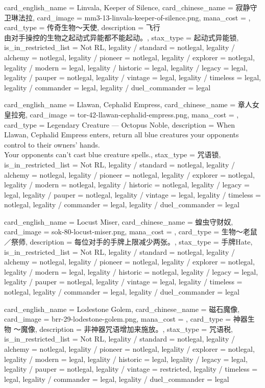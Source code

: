 \documentclass[lang = cn, color = black, 10pt]{AllThatStax}
\begin{document}
\card
{
	card_english_name = {Linvala, Keeper of Silence},
	card_chinese_name = {寂静守卫琳法拉},
	card_image = mm3-13-linvala-keeper-of-silence.png,
	mana_cost = ,
	card_type = 传奇生物～天使,
	description = {飞行\\
		由对手操控的生物之起动式异能都不能起动。},
	stax_type = 起动式异能锁,
	is_in_restricted_list = Not RL,
	legality / standard = notlegal,
	legality / alchemy = notlegal,
	legality / pioneer = notlegal,
	legality / explorer = notlegal,
	legality / modern = legal,
	legality / historic = legal,
	legality / legacy = legal,
	legality / pauper = notlegal,
	legality / vintage = legal,
	legality / timeless = legal,
	legality / commander = legal,
	legality / duel_commander = legal
}

\card
{
	card_english_name = {Llawan, Cephalid Empress},
	card_chinese_name = {章人女皇拉宛},
	card_image = tor-42-llawan-cephalid-empress.png,
	mana_cost = ,
	card_type = Legendary Creature — Octopus Noble,
	description = {When Llawan, Cephalid Empress enters, return all blue creatures your opponents control to their owners' hands.\\
		Your opponents can't cast blue creature spells.},
	stax_type = 咒语锁,
	is_in_restricted_list = Not RL,
	legality / standard = notlegal,
	legality / alchemy = notlegal,
	legality / pioneer = notlegal,
	legality / explorer = notlegal,
	legality / modern = notlegal,
	legality / historic = notlegal,
	legality / legacy = legal,
	legality / pauper = notlegal,
	legality / vintage = legal,
	legality / timeless = notlegal,
	legality / commander = legal,
	legality / duel_commander = legal
}

\card
{
	card_english_name = {Locust Miser},
	card_chinese_name = {蝗虫守财奴},
	card_image = sok-80-locust-miser.png,
	mana_cost = ,
	card_type = 生物～老鼠／祭师,
	description = {每位对手的手牌上限减少两张。},
	stax_type = 手牌Hate,
	is_in_restricted_list = Not RL,
	legality / standard = notlegal,
	legality / alchemy = notlegal,
	legality / pioneer = notlegal,
	legality / explorer = notlegal,
	legality / modern = legal,
	legality / historic = notlegal,
	legality / legacy = legal,
	legality / pauper = notlegal,
	legality / vintage = legal,
	legality / timeless = notlegal,
	legality / commander = legal,
	legality / duel_commander = legal
}

\card
{
	card_english_name = {Lodestone Golem},
	card_chinese_name = {磁石魔像},
	card_image = brr-29-lodestone-golem.png,
	mana_cost = ,
	card_type = 神器生物 ～魔像,
	description = {非神器咒语增加来施放。},
	stax_type = 咒语税,
	is_in_restricted_list = Not RL,
	legality / standard = notlegal,
	legality / alchemy = notlegal,
	legality / pioneer = notlegal,
	legality / explorer = notlegal,
	legality / modern = legal,
	legality / historic = legal,
	legality / legacy = legal,
	legality / pauper = notlegal,
	legality / vintage = restricted,
	legality / timeless = legal,
	legality / commander = legal,
	legality / duel_commander = legal
}
\end{document}

